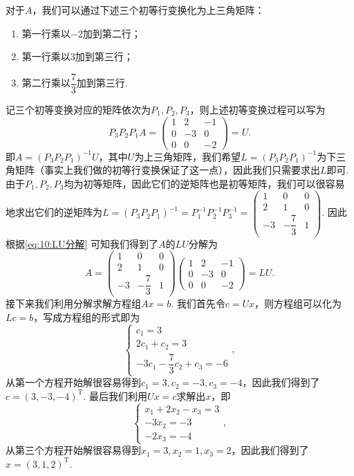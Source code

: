 \begin{solution}
    对于$A$，我们可以通过下述三个初等行变换化为上三角矩阵：
    \begin{enumerate}
        \item 第一行乘以$-2$加到第二行；
        \item 第一行乘以$3$加到第三行；
        \item 第二行乘以$\dfrac{7}{3}$加到第三行.
    \end{enumerate}
    记三个初等变换对应的矩阵依次为$P_1,P_2,P_3$，则上述初等变换过程可以写为
    \begin{equation}\label{eq:10:LU分解}
        P_3P_2P_1A=\begin{pmatrix}
            1 & 2 & -1 \\ 0 & -3 & 0 \\ 0 & 0 & -2
        \end{pmatrix}=U.
    \end{equation}
    即$A=(P_3P_2P_1)^{-1}U$，其中$U$为上三角矩阵，我们希望$L=(P_3P_2P_1)^{-1}$为下三角矩阵（事实上我们做的初等行变换保证了这一点），因此我们只需要求出$L$即可. 由于$P_1,P_2,P_3$均为初等矩阵，因此它们的逆矩阵也是初等矩阵，我们可以很容易地求出它们的逆矩阵为$L=(P_3P_2P_1)^{-1}=P_1^{-1}P_2^{-1}P_3^{-1}=\begin{pmatrix}
            1 & 0 & 0 \\ 2 & 1 & 0 \\ -3 & -\dfrac{7}{3} & 1
        \end{pmatrix}$. 因此根据\autoref{eq:10:LU分解} 可知我们得到了$A$的$LU$分解为
    \[A=\begin{pmatrix}
            1 & 0 & 0 \\ 2 & 1 & 0 \\ -3 & -\dfrac{7}{3} & 1
        \end{pmatrix}\begin{pmatrix}
            1 & 2 & -1 \\ 0 & -3 & 0 \\ 0 & 0 & -2
        \end{pmatrix}=LU.\]
    接下来我们利用分解求解方程组$Ax=b$. 我们首先令$c=Ux$，则方程组可以化为$Lc=b$，写成方程组的形式即为
    \[\begin{cases}
            c_1=3 \\ 2c_1+c_2=3 \\ -3c_1-\dfrac{7}{3}c_2+c_3=-6
        \end{cases},\]
    从第一个方程开始解很容易得到$c_1=3,c_2=-3,c_3=-4$，因此我们得到了$c=(3,-3,-4)^\mathrm{T}$. 最后我们利用$Ux=c$求解出$x$，即
    \[\begin{cases}
            x_1+2x_2-x_3=3 \\ -3x_2=-3 \\ -2x_3=-4
        \end{cases},\]
    从第三个方程开始解很容易得到$x_1=3,x_2=1,x_3=2$，因此我们得到了$x=(3,1,2)^\mathrm{T}$.
\end{solution}

